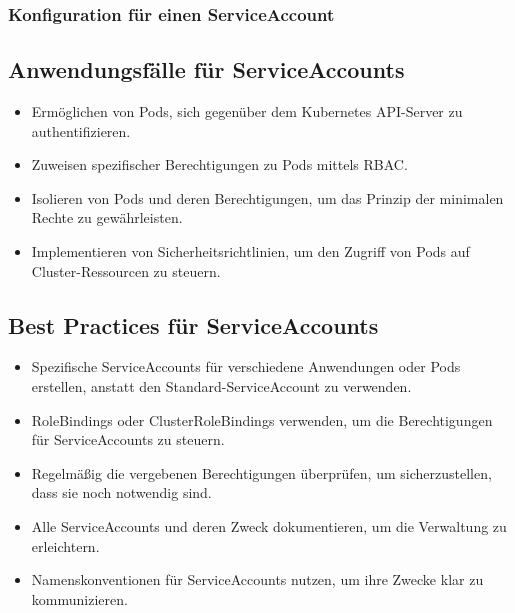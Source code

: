 \subsubsection{Konfiguration für einen ServiceAccount}


\subsection{Anwendungsfälle für ServiceAccounts}
\begin{itemize}
    \item Ermöglichen von Pods, sich gegenüber dem Kubernetes API-Server zu authentifizieren.
    \item Zuweisen spezifischer Berechtigungen zu Pods mittels RBAC.
    \item Isolieren von Pods und deren Berechtigungen, um das Prinzip der minimalen Rechte zu gewährleisten.
    \item Implementieren von Sicherheitsrichtlinien, um den Zugriff von Pods auf Cluster-Ressourcen zu steuern.
\end{itemize}

\subsection{Best Practices für ServiceAccounts}
\begin{itemize}
    \item Spezifische ServiceAccounts für verschiedene Anwendungen oder Pods erstellen, anstatt den Standard-ServiceAccount zu verwenden.
    \item RoleBindings oder ClusterRoleBindings verwenden, um die Berechtigungen für ServiceAccounts zu steuern.
    \item Regelmäßig die vergebenen Berechtigungen überprüfen, um sicherzustellen, dass sie noch notwendig sind.
    \item Alle ServiceAccounts und deren Zweck dokumentieren, um die Verwaltung zu erleichtern.
    \item Namenskonventionen für ServiceAccounts nutzen, um ihre Zwecke klar zu kommunizieren.
\end{itemize}

